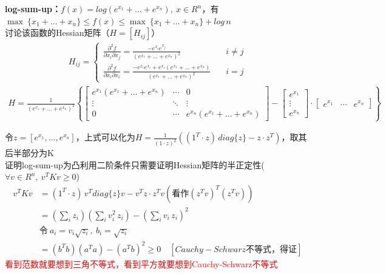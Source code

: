 \documentclass[11pt]{ctexart}         %
\begin{document}
\textbf{log-sum-up：}$f(x)=log(e^{x_1}+\dots+e^{x_n}),\ x\in R^n$，有\\
$\max\ \{x_1+\dots+x_n\}\leq f(x)\leq \max\ \{x_1+\dots+x_n\}+log\,n$\\
讨论该函数的Hessian矩阵（$H=[H_{ij}]$）
\begin{align*}
	H_{ij}=
	\begin{cases}
		\displaystyle\frac{\partial^2f}{\partial x_i\partial x_j}=\displaystyle\frac{-e^{x_i}e^{x_j}}{(e^{x_1}+\dots+e^{x_n})^2}\quad &i\neq j\\[12pt]
		\displaystyle\frac{\partial^2f}{\partial x_i\partial x_i}=\displaystyle\frac{-e^{x_i}e^{x_i}+e^{x_i}(e^{x_1}+\dots+e^{x_n})}{(e^{x_1}+\dots+e^{x_n})^2}\quad &i=j
	\end{cases}
\end{align*}
\begin{align*}
		H=\frac{1}{(e^{x_1}+\dots+e^{x_n})^2}
	\left\{
	\left[
	\begin{array}{ccc}
		e^{x_1}(e^{x_1}+\dots+e^{x_n})& \cdots & 0 \\
		\vdots & \ddots & \vdots \\
		0 & \cdots & e^{x_n}(e^{x_1}+\dots+e^{x_n})
	\end{array}
	\right]-
	\left[
	\begin{array}{c}
		e^{x_1}\\
		\vdots\\
		e^{x_n}
	\end{array}
	\right]\cdot
	\left[
	\begin{array}{ccc}
		e^{x_1}	& \cdots & e^{x_n}
	\end{array}
	\right]
	\right\}
\end{align*}

令$z=\displaystyle\left[e^{x_1},\dots,e^{x_n}\right]$，上式可以化为$H=\displaystyle\frac{1}{(1\cdot z)^2}\left((1^T\cdot z)\,diag\{z\}-z\cdot z^T\right)$，取其后半部分为K\\[6pt]
证明log-sum-up为凸利用二阶条件只需要证明Hessian矩阵的半正定性($\forall v\in R^n,\ v^TKv\geq 0$)
\begin{align*}
	v^TKv&=(1^T\cdot z)\,v^T diag\{z\}v-v^Tz\cdot z^Tv(\text{看作}(z^Tv)^T(z^Tv))\\
	&=(\sum_{i}z_i)(\sum_{i}v_i^2\,z_i)-(\sum_{i}v_i\,z_i)^2\\
	&\text{令}\ a_i=v_i\sqrt{z_i},\ b_i=\sqrt{z_i}\\
	&=(b^Tb)(a^Ta)-(a^Tb)^2\geq 0\quad [Cauchy-Schwarz\text{不等式，得证}]
\end{align*}
\textcolor{red}{看到范数就要想到三角不等式，看到平方就要想到Cauchy-Schwarz不等式}	
\end{document}
